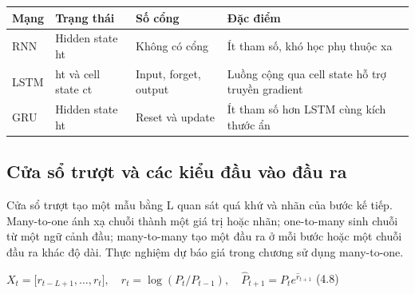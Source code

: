\label{tab:legacy-4.1}

{\def\LTcaptype{none} %
\begin{longtable}[]{@{}
  >{\raggedright\arraybackslash}p{}
  >{\centering\arraybackslash}p{}
  >{\centering\arraybackslash}p{}
  >{\raggedright\arraybackslash}p{}@{}}
\toprule\noalign{}
\begin{minipage}[b]{\linewidth}\raggedright
\textbf{Mạng}
\end{minipage} & \begin{minipage}[b]{\linewidth}\centering
\textbf{Trạng thái}
\end{minipage} & \begin{minipage}[b]{\linewidth}\centering
\textbf{Số cổng}
\end{minipage} & \begin{minipage}[b]{\linewidth}\centering
\textbf{Đặc điểm}
\end{minipage} \\
\midrule\noalign{}
\endhead
\bottomrule\noalign{}
\endlastfoot
RNN & Hidden state ht & Không có cổng & Ít tham số, khó học phụ thuộc
xa \\
LSTM & ht và cell state ct & Input, forget, output & Luồng cộng qua cell
state hỗ trợ truyền gradient \\
GRU & Hidden state ht & Reset và update & Ít tham số hơn LSTM cùng kích
thước ẩn \\
\end{longtable}
}

\subsection{Cửa sổ trượt và các kiểu đầu vào đầu ra}\label{cux1eeda-sux1ed5-trux1b0ux1ee3t-vuxe0-cuxe1c-kiux1ec3u-ux111ux1ea7u-vuxe0o-ux111ux1ea7u-ra}

Cửa sổ trượt tạo một mẫu bằng L quan sát quá khứ và nhãn của bước kế
tiếp. Many-to-one ánh xạ chuỗi thành một giá trị hoặc nhãn; one-to-many
sinh chuỗi từ một ngữ cảnh đầu; many-to-many tạo một đầu ra ở mỗi bước
hoặc một chuỗi đầu ra khác độ dài. Thực nghiệm dự báo giá trong chương
sử dụng many-to-one.

\(X_{t} = \lbrack r_{t - L + 1},\ldots,r_{t}\rbrack,\quad r_{t} = \log(P_{t}/P_{t - 1}),\quad{\hat{P}}_{t + 1} = P_{t}e^{{\hat{r}}_{t + 1}}\)
(4.8)

